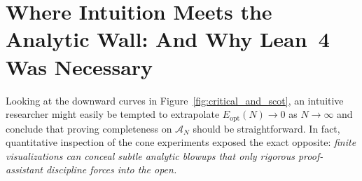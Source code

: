 \documentclass[11pt,a4paper]{article}
\begin{document}
\section{Where Intuition Meets the Analytic Wall: And Why Lean~4 Was Necessary}\label{sec:wall}

Looking at the downward curves in Figure~\ref{fig:critical_and_scot}, an intuitive researcher might easily be tempted to extrapolate $E_{\mathrm{opt}}(N) \to 0$ as $N \to \infty$ and conclude that proving completeness on $\mathcal{A}_N$ should be straightforward. In fact, quantitative inspection of the cone experiments exposed the exact opposite: \emph{finite visualizations can conceal subtle analytic blowups that only rigorous proof-assistant discipline forces into the open.}
\end{document}
